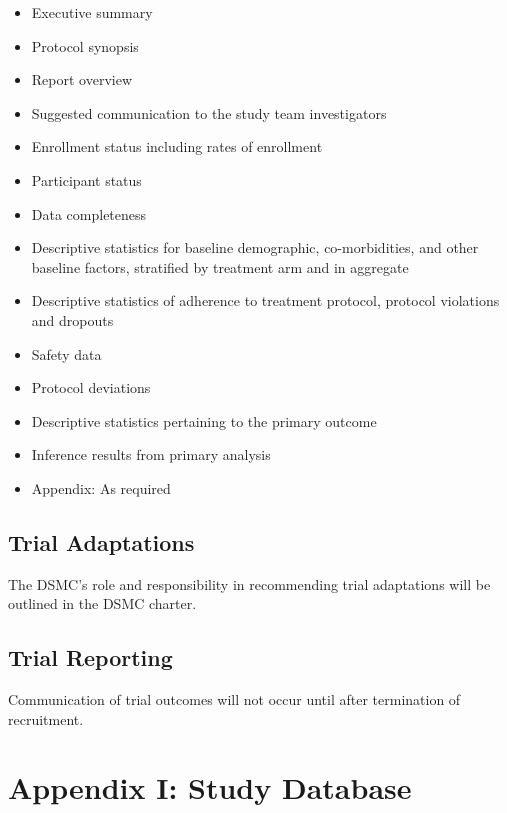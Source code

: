 \documentclass[
]{article}
\providecommand{\tightlist}{%
  \setlength{\itemsep}{0pt}\setlength{\parskip}{0pt}}
\begin{document}
\begin{itemize}\tightlist
  \item
        Executive summary
  \item
        Protocol synopsis
  \item
        Report overview
  \item
        Suggested communication to the study team investigators
  \item
        Enrollment status including rates of enrollment
  \item
        Participant status
  \item 
        Data completeness
  \item
        Descriptive statistics for baseline demographic, co-morbidities, and other baseline factors, stratified by treatment arm and in aggregate
  \item
        Descriptive statistics of adherence to treatment protocol, protocol violations and dropouts
  \item
        Safety data
  \item
        Protocol deviations
  \item 
        Descriptive statistics pertaining to the primary outcome
  \item
        Inference results from primary analysis
  \item
        Appendix: As required
\end{itemize}


\hypertarget{trial-adaptations}{%
  \subsection{Trial Adaptations}\label{trial-adaptations}}

The DSMC's role and responsibility in recommending trial adaptations will be outlined in the DSMC charter.

\hypertarget{trial-reporting}{%
  \subsection{Trial Reporting}\label{trial-reporting}}

Communication of trial outcomes will not occur until after termination of recruitment.

\clearpage

\printbibliography[heading=bibintoc]

\clearpage

\hypertarget{study-database}{%
  \section{Appendix I: Study Database}\label{study-database}}
\end{document}
